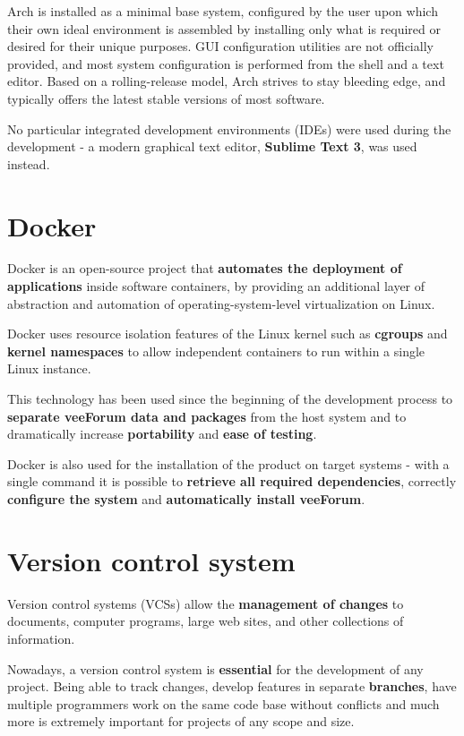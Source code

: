 \documentclass[12pt]{report}
\renewcommand\emph{\textbf}
\begin{document}
                Arch is installed as a minimal base system, configured by the user upon which their own ideal environment is assembled by installing only what is required or desired for their unique purposes. GUI configuration utilities are not officially provided, and most system configuration is performed from the shell and a text editor. Based on a rolling-release model, Arch strives to stay bleeding edge, and typically offers the latest stable versions of most software.

                No particular integrated development environments (IDEs) were used during the development - a modern graphical text editor, \emph{Sublime Text 3}, was used instead.

            \section{Docker}
                Docker is an open-source project that \emph{automates the deployment of applications} inside software containers, by providing an additional layer of abstraction and automation of operating-system-level virtualization on Linux.

                Docker uses resource isolation features of the Linux kernel such as \emph{cgroups} and \emph{kernel namespaces} to allow independent containers to run within a single Linux instance.

                This technology has been used since the beginning of the development process to \emph{separate veeForum data and packages} from the host system and to dramatically increase \emph{portability} and \emph{ease of testing}.

                Docker is also used for the installation of the product on target systems - with a single command it is possible to \emph{retrieve all required dependencies}, correctly \emph{configure the system} and \emph{automatically install veeForum}.

            \section{Version control system}
                Version control systems (VCSs) allow the \emph{management of changes} to documents, computer programs, large web sites, and other collections of information.

                Nowadays, a version control system is \emph{essential} for the development of any project.
                Being able to track changes, develop features in separate \emph{branches}, have multiple programmers work on the same code base without conflicts and much more is extremely important for projects of any scope and size.
\end{document}

